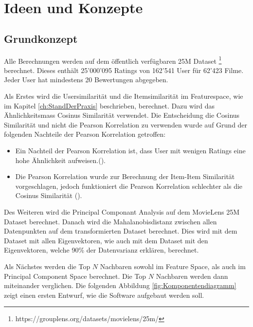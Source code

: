 \chapter{Ideen und Konzepte}
\label{sec: Ideen, Konzepte}
\section{Grundkonzept}


Alle Berechnungen werden auf dem öffentlich verfügbaren 25M Dataset \footnote{https://grouplens.org/datasets/movielens/25m/} berechnet. Dieses enthält 25'000'095 Ratings von 162'541 User für 62'423 Filme. Jeder User hat mindestens 20 Bewertungen abgegeben. 

 Als Erstes wird die Usersimilarität und die Itemsimilarität im Featurespace, wie im Kapitel \ref{ch:StandDerPraxis}  beschrieben, berechnet. Dazu wird das Ähnlichkeitsmass Cosinus Similarität verwendet. Die Entscheidung die Cosinus Similarität und nicht die Pearson Korrelation zu verwenden wurde auf Grund der folgenden Nachteile der Pearson Korrelation getroffen:
\begin{itemize}
    \item Ein Nachteil der Pearson Korrelation ist, dass User mit wenigen Ratings eine hohe Ähnlichkeit aufweisen.(\cite{Ekstrand2011}).
    \item Die Pearson Korrelation wurde zur Berechnung der Item-Item Similarität vorgeschlagen, jedoch funktioniert die Pearson Korrelation schlechter als die Cosinus Similarität (\cite{10.1145/371920.372071}).
    
    
\end{itemize}

Des Weiteren wird die Principal Componant Analysis auf dem MovieLens 25M Dataset berechnet. Danach wird die Mahalanobisdistanz zwischen allen Datenpunkten auf dem transformierten Dataset berechnet. Dies wird mit dem Dataset mit allen Eigenvektoren, wie auch mit dem Dataset mit den Eigenvektoren, welche 90\% der Datenvarianz erklären, berechnet.

Als Nächstes werden die Top $N$ Nachbaren sowohl im Feature Space, als auch im Principal Component Space berechnet. Die Top $N$ Nachbaren werden dann miteinander verglichen. Die folgenden Abbildung \ref{fig:Komponentendiagramm} zeigt einen ersten Entwurf, wie die Software aufgebaut werden soll.

